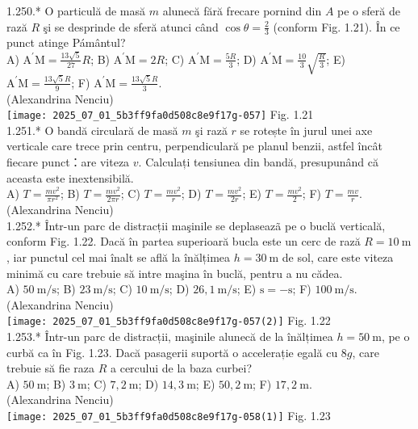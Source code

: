 {1.250.* O particulă de masă $m$ alunecă fără frecare pornind din $A$ pe o sferă de rază $R$ şi se desprinde de sferă atunci când $\cos \theta=\frac{2}{3}$ (conform Fig. 1.21). În ce punct atinge Pámântul?\\ A) $\mathrm{A}^{\prime} \mathrm{M}=\frac{13 \sqrt{5}}{27} R$; B) $\mathrm{A}^{\prime} \mathrm{M}=2 R$; C) $\mathrm{A}^{\prime} \mathrm{M}=\frac{5 R}{3}$; D) $\mathrm{A}^{\prime} \mathrm{M}=\frac{10}{3} \sqrt{\frac{R}{3}}$; E) $\mathrm{A}^{\prime} \mathrm{M}=\frac{13 \sqrt{5} R}{9}$; F) $\mathrm{A}^{\prime} \mathrm{M}=\frac{13 \sqrt{5} R}{3}$.\\ (Alexandrina Nenciu)\\ \texttt{[image: 2025\_07\_01\_5b3ff9fa0d508c8e9f17g-057]} Fig. 1.21\\

1.251.* O bandă circulară de masă $m$ şi rază $r$ se rotește în jurul unei axe verticale care trece prin centru, perpendiculară pe planul benzii, astfel încât fiecare punct：are viteza $v$. Calculați tensiunea din bandă, presupunând că aceasta este inextensibilă.\\ A) $T=\frac{m v^{2}}{\pi r^{2}}$; B) $T=\frac{m v^{2}}{2 \pi r}$; C) $T=\frac{m v^{2}}{r}$; D) $T=\frac{m v^{2}}{2 r}$; E) $T=\frac{m v^{2}}{2}$; F) $T=\frac{m v}{r}$.\\ (Alexandrina Nenciu)\\

1.252.* Într-un parc de distracții maşinile se deplaseazã pe o buclă verticală, conform Fig. 1.22. Dacă în partea superioară bucla este un cerc de rază $R=10 \mathrm{~m}$, iar punctul cel mai înalt se află la înălțimea $h=30 \mathrm{~m}$ de sol, care este viteza minimă cu care trebuie să intre maşina în buclă, pentru a nu cădea.\\ A) $50 \mathrm{~m} / \mathrm{s}$; B) $23 \mathrm{~m} / \mathrm{s}$; C) $10 \mathrm{~m} / \mathrm{s}$; D) $26,1 \mathrm{~m} / \mathrm{s}$; E) $\mathrm{s}=-\mathrm{s}$; F) $100 \mathrm{~m} / \mathrm{s}$.\\ (Alexandrina Nenciu)\\ \texttt{[image: 2025\_07\_01\_5b3ff9fa0d508c8e9f17g-057(2)]} Fig. 1.22\\

1.253.* Într-un parc de distracții, maşinile alunecă de la înălțimea $h=50 \mathrm{~m}$, pe o curbă ca în Fig. 1.23. Dacă pasagerii suportă o accelerație egală cu $8 g$, care trebuie să fie raza $R$ a cercului de la baza curbei?\\ A) $50 \mathrm{~m}$; B) $3 \mathrm{~m}$; C) $7,2 \mathrm{~m}$; D) $14,3 \mathrm{~m}$; E) $50,2 \mathrm{~m}$; F) $17,2 \mathrm{~m}$.\\ (Alexandrina Nenciu)\\ \texttt{[image: 2025\_07\_01\_5b3ff9fa0d508c8e9f17g-058(1)]} Fig. 1.23\\

}
